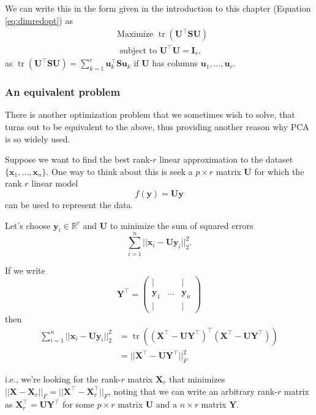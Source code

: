 \documentclass[]{book}
\theoremstyle{definition}
\theoremstyle{definition}
\theoremstyle{definition}
\theoremstyle{remark}
\begin{document}
We can write this in the form given in the introduction to this chapter (Equation \eqref{eq:dimredopt}) as
\begin{align*}
&\mbox{Maximize } \operatorname{tr}(\boldsymbol U^\top \boldsymbol S\boldsymbol U) \\
 &\mbox{ subject to } \boldsymbol U^\top \boldsymbol U=\mathbf I_r,
 \end{align*}
as \(\operatorname{tr}(\boldsymbol U^\top \boldsymbol S\boldsymbol U) = \sum_{k=1}^r \boldsymbol u_k^\top \boldsymbol S\boldsymbol u_k\) if \(\boldsymbol U\) has columns \(\boldsymbol u_1, \ldots, \boldsymbol u_r\).

\hypertarget{an-equivalent-problem}{%
\subsubsection*{An equivalent problem}\label{an-equivalent-problem}}

There is another optimization problem that we sometimes wish to solve, that turns out to be equivalent to the above, thus providing another reason why PCA is so widely used.

Suppose we want to find the best rank-\(r\) linear approximation to the dataset \(\{\boldsymbol x_1, \ldots, \boldsymbol x_n\}\). One way to think about this is seek a \(p\times r\) matrix \(\boldsymbol U\) for which the rank \(r\) linear model
\[f(\boldsymbol y) = \boldsymbol U\boldsymbol y\] can be used to represent the data.

Let's choose \(\boldsymbol y_i\in \mathbb{R}^r\) and \(\boldsymbol U\) to minimize the sum of squared errors
\[\sum_{i=1}^n ||\boldsymbol x_i - \boldsymbol U\boldsymbol y_i||^2_2.\]

If we write
\[\boldsymbol Y^\top = \begin{pmatrix} 
| &&|\\
\boldsymbol y_1& \ldots & \boldsymbol y_n\\
| &&|
\end{pmatrix}\]
then
\begin{align*}
\sum_{i=1}^n ||\boldsymbol x_i - \boldsymbol U\boldsymbol y_i||^2_2 &=\operatorname{tr}((\boldsymbol X^\top - \boldsymbol U\boldsymbol Y^\top)^\top (\boldsymbol X^\top - \boldsymbol U\boldsymbol Y^\top))\\
&=||\boldsymbol X^\top - \boldsymbol U\boldsymbol Y^\top||_F^2
\end{align*}

i.e., we're looking for the rank-\(r\) matrix \(\boldsymbol X_r\) that minimizes \(||\boldsymbol X- \boldsymbol X_r||_F=||\boldsymbol X^\top - \boldsymbol X_r^\top||_F\), noting that we can write an arbitrary rank-\(r\) matrix as \(\boldsymbol X_r^\top = \boldsymbol U\boldsymbol Y^\top\) for some \(p\times r\) matrix \(\boldsymbol U\) and a \(n \times r\) matrix \(\boldsymbol Y\).
\end{document}
